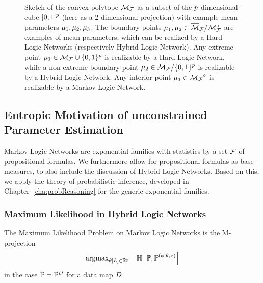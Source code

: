 \begin{figure}[h]\label{fig:meansetSketch}
\begin{center}
	
\end{center}
\caption{Sketch of the convex polytope ${\mathcal{M}_{\mathcal{F}}}$ as a subset of the $p$-dimensional cube $[0,1]^p$ (here as a 2-dimensional projection) with example mean 	parameters $\mu_1,\mu_2,\mu_3$.
	The boundary points $\mu_1,\mu_2\in\overline{\mathcal{M}}_{\mathcal{F}}/{\mathcal{M}}^{\circ}_{\mathcal{F}}$ are examples of mean parameters, which can be realized by a Hard Logic Networks (respectively Hybrid Logic Network). 
	Any extreme point $\mu_1\in\mathcal{M}_{\mathcal{F}}\cup\{0,1\}^{p}$ is realizable by a Hard Logic Network, while a non-extreme boundary point $\mu_2\in\mathcal{M}_{\mathcal{F}}/\{0,1\}^{p}$ is realizable by a Hybrid Logic Network.
	Any interior point $\mu_3\in{\mathcal{M}_{\mathcal{F}}}^{\circ}$ is realizable by a Markov Logic Network.
} 
\end{figure}




\subsection{Entropic Motivation of unconstrained Parameter Estimation} \label{sec:parameterEstimation} %

Markov Logic Networks are exponential families with statistics by a set $\mathcal{F}$ of propositional formulas.
We furthermore allow for propositional formulas as base measures, to also include the discussion of Hybrid Logic Networks.
Based on this, we apply the theory of probabilistic inference, developed in Chapter~\ref{cha:probReasoning} for the generic exponential families.

\subsubsection{Maximum Likelihood in Hybrid Logic Networks}

The Maximum Likelihood Problem on Markov Logic Networks is the M-projection
\begin{align*}
	\mathrm{argmax}_{\theta\left[L\right]\in\mathbb{R}^{p}} \quad 
	\mathbb{H}\left[\mathbb{P},\mathbb{P}^{(\phi,\theta,\nu)}\right]	
\end{align*}
in the case $\mathbb{P}=\mathbb{P}^{D}$ for a data map $D$.

